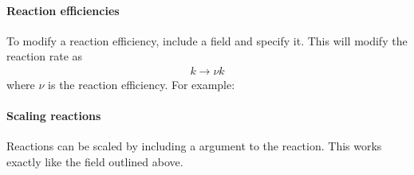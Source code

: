 \documentclass[letterpaper,10pt,english]{sphinxmanual}
\begin{document}
\paragraph{Reaction efficiencies}
\label{\detokenize{Applications/CdrPlasmaModel:reaction-efficiencies}}
To modify a reaction efficiency, include a field  and specify it.
This will modify the reaction rate as
\begin{equation*}
\begin{split}k \rightarrow \nu k\end{split}
\end{equation*}
where \(\nu\) is the reaction efficiency.
For example:

\begin{sphinxVerbatim}[commandchars=\\\{\},formatcom=\scriptsize]
  \PYG{p}{[}
       
       
       
       
       
       
       
       
       
       
       
  \PYG{p}{]}
\end{sphinxVerbatim}


\paragraph{Scaling reactions}
\label{\detokenize{Applications/CdrPlasmaModel:scaling-reactions}}
Reactions can be scaled by including a  argument to the reaction.
This works exactly like the  field outlined above.
\end{document}
